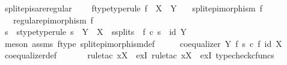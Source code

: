 \begin{isabellebody}
\isamarkupfalse%
\ split{\isacharunderscore}{\kern0pt}epis{\isacharunderscore}{\kern0pt}are{\isacharunderscore}{\kern0pt}regular{\isacharcolon}{\kern0pt}\ \isanewline
\ \ \ f{\isacharunderscore}{\kern0pt}type{\isacharbrackleft}{\kern0pt}type{\isacharunderscore}{\kern0pt}rule{\isacharbrackright}{\kern0pt}{\isacharcolon}{\kern0pt}\ {\isachardoublequoteopen}f\ {\isacharcolon}{\kern0pt}\ X\ {\isasymrightarrow}\ Y{\isachardoublequoteclose}\isanewline
\ \ \ {\isachardoublequoteopen}split{\isacharunderscore}{\kern0pt}epimorphism\ f{\isachardoublequoteclose}\isanewline
\ \ \ {\isachardoublequoteopen}regular{\isacharunderscore}{\kern0pt}epimorphism\ f{\isachardoublequoteclose}\isanewline
%
\isadelimproof
%
\endisadelimproof
%
\isatagproof
{}\isamarkupfalse%
\ {\isacharminus}{\kern0pt}\ \isanewline
\ \ \isamarkupfalse%
\ s\ \ s{\isacharunderscore}{\kern0pt}type{\isacharbrackleft}{\kern0pt}type{\isacharunderscore}{\kern0pt}rule{\isacharbrackright}{\kern0pt}{\isacharcolon}{\kern0pt}\ {\isachardoublequoteopen}s\ {\isacharcolon}{\kern0pt}\ Y\ {\isasymrightarrow}\ X{\isachardoublequoteclose}\ \ s{\isacharunderscore}{\kern0pt}splits{\isacharcolon}{\kern0pt}\ \ {\isachardoublequoteopen}f\ {\isasymcirc}\isactrlsub c\ s\ {\isacharequal}{\kern0pt}\ id\ Y{\isachardoublequoteclose}\isanewline
\ \ \ \ \isamarkupfalse%
\ {\isacharparenleft}{\kern0pt}meson\ assms{\isacharparenleft}{\kern0pt}{}{\isacharparenright}{\kern0pt}\ f{\isacharunderscore}{\kern0pt}type\ split{\isacharunderscore}{\kern0pt}epimorphism{\isacharunderscore}{\kern0pt}def{}{\isacharparenright}{\kern0pt}\isanewline
\ \ \isamarkupfalse%
\ \isamarkupfalse%
\ {\isachardoublequoteopen}coequalizer\ Y\ f\ {\isacharparenleft}{\kern0pt}s\ {\isasymcirc}\isactrlsub c\ f{\isacharparenright}{\kern0pt}\ {\isacharparenleft}{\kern0pt}id\ X{\isacharparenright}{\kern0pt}{\isachardoublequoteclose}\isanewline
\ \ \ \ \isamarkupfalse%
\ coequalizer{\isacharunderscore}{\kern0pt}def\ \isanewline
\ \ \ \ \isamarkupfalse%
\ {\isacharparenleft}{\kern0pt}rule{\isacharunderscore}{\kern0pt}tac\ x{\isacharequal}{\kern0pt}{\isachardoublequoteopen}X{\isachardoublequoteclose}\ \ exI{\isacharcomma}{\kern0pt}\ rule{\isacharunderscore}{\kern0pt}tac\ x{\isacharequal}{\kern0pt}{\isachardoublequoteopen}X{\isachardoublequoteclose}\ \ exI{\isacharcomma}{\kern0pt}\ typecheck{\isacharunderscore}{\kern0pt}cfuncs{\isacharcomma}{\kern0pt}\isanewline

\end{isabellebody}
